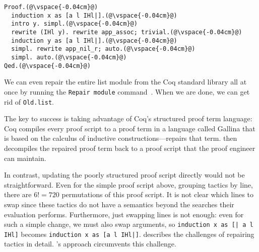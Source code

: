 \begin{lstlisting}
Proof.(@\vspace{-0.04cm}@)
  induction x as [a l IHl|].(@\vspace{-0.04cm}@)
  intro y. simpl.(@\vspace{-0.04cm}@)
  rewrite (IHl y). rewrite app_assoc; trivial.(@\vspace{-0.04cm}@)
  induction y as [a l IHl|].(@\vspace{-0.04cm}@)
  simpl. rewrite app_nil_r; auto.(@\vspace{-0.04cm}@)
  simpl. auto.(@\vspace{-0.04cm}@)
Qed.(@\vspace{-0.04cm}@)
\end{lstlisting}
We can even repair the entire list module from the Coq standard library all at once by running the \lstinline{Repair module}
command~. %
When we are done, we can get rid of \lstinline{Old.list}. %

The key to success is taking advantage of Coq's structured proof term language:
Coq compiles every proof script to a proof term in a language called Gallina that is based on the calculus of inductive 
constructions---\toolname repairs that term.
\toolname then decompiles the repaired proof term back to a proof script that the proof engineer can maintain.

In contrast, updating the poorly structured proof script directly would not be straightforward.
Even for the simple proof script above, grouping tactics by line, there are $6! = 720$ permutations of this proof script.
It is not clear which lines to swap since these tactics do not have a semantics beyond the searches their evaluation performs.
Furthermore, just swapping lines is not enough: even for such a simple change, we must also swap
arguments, so \lstinline{induction x as [| a l IHl]} becomes \lstinline{induction x as [a l IHl|]}.
\citet{robert2018} describes the challenges of repairing tactics in detail.
\toolname's approach circumvents this challenge.




